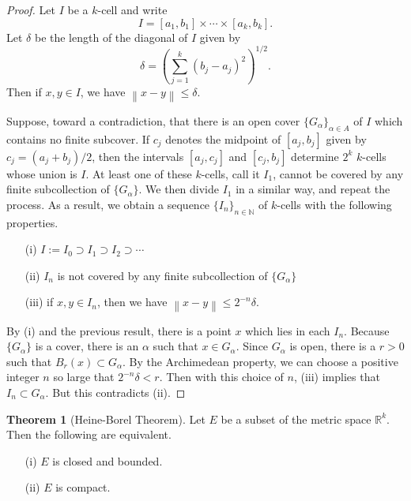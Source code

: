 \documentclass[12pt]{article}
\newcommand{\norm}[1]{\left\lVert#1\right\rVert}
\theoremstyle{definition}
\theoremstyle{theorem}
\newtheorem{theorem}[definition]{Theorem}
\begin{document}
\begin{proof}
Let $I$ be a $k$-cell and write 
\[
I = [a_1, b_1] \times \cdots \times [a_k, b_k].
\]
Let $\delta$ be the length of the diagonal of $I$ given by  
\[
\delta = \left(\sum_{j=1}^k (b_j - a_j)^2\right)^{1/2}.
\]
Then if $x,y \in I$, we have $\norm{x - y} \leqslant \delta$. 



Suppose, toward a contradiction, that there is an open cover $\{G_\alpha\}_{\alpha \in A}$ of $I$ which contains no finite subcover. If $c_j$ denotes the midpoint of $[a_j, b_j]$ given by $c_j = (a_j + b_j)/2$, then the intervals $[a_j, c_j]$ and $[c_j, b_j]$ determine $2^k$ $k$-cells whose union is $I$. At least one of these $k$-cells, call it $I_1$, cannot be covered by any finite subcollection of $\{G_\alpha\}$. We then divide $I_1$ in a similar way, and repeat the process. As a result, we obtain a sequence $\{I_n\}_{n \in \mathbb{N}}$ of $k$-cells with the following properties. 
\begin{enumerate}
\item[(i)] $I := I_0 \supset I_1 \supset I_2 \supset \cdots$
\item[(ii)] $I_n$ is not covered by any finite subcollection of $\{G_\alpha\}$
\item[(iii)] if $x,y \in I_n$, then we have $\norm{x-y} \leqslant 2^{-n}\delta$. 
\end{enumerate}

By (i) and the previous result, there is a point $x$ which lies in each $I_n$. Because $\{G_\alpha\}$ is a cover, there is an $\alpha$ such that $x \in G_{\alpha}$. Since $G_{\alpha}$ is open, there is a $r > 0$ such that $B_{r}(x) \subset G_{\alpha}$. By the Archimedean property, we can choose a positive integer $n$ so large that $2^{-n}\delta < r$. Then with this choice of $n$, (iii) implies that $I_n \subset G_\alpha$. But this contradicts (ii). 
\end{proof}

\begin{theorem}[Heine-Borel Theorem]
Let $E$ be a subset of the metric space $\mathbb{R}^k$. Then the following are equivalent. 
\begin{enumerate}
\item[(i)] $E$ is closed and bounded. 
\item[(ii)] $E$ is compact. 
\end{enumerate}
\end{theorem}
\end{document}
